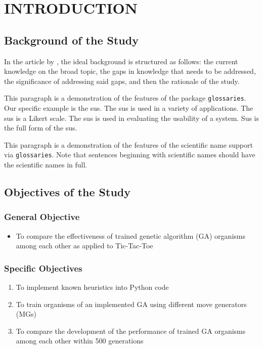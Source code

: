 \documentclass{strrespaper-trad}
\newcommand{\ttt}{Tic-Tac-Toe}
\begin{document}
	\chapter{INTRODUCTION}
		\section{Background of the Study}

			In the article  by \citeauthor{sachdevHowWriteBackground2018}, the ideal background is structured as follows: the current knowledge on the broad topic, the gaps in knowledge that needs to be addressed, the significance of addressing said gaps, and then the rationale of the study.

			This paragraph is a demonstration of the features of the package \texttt{glossaries}.
			Our specific example is the sus.
			The sus is used in a variety of applications.
			The sus is a Likert scale.
			The sus is used in evaluating the usability of a system.
			Sus is the full form of the sus.

			This paragraph is a demonstration of the features of the scientific name support via \texttt{glossaries}.
			Note that sentences beginning with scientific names should have the scientific names in full.

		\section{Objectives of the Study}
			\subsection{General Objective}
				\begin{itemize}
					\item To compare the effectiveness of trained genetic algorithm (GA) organisms among each other as applied to \ttt{}
				\end{itemize}
			\subsection{Specific Objectives}
				\begin{enumerate}
					\item To implement known heuristics into Python code
					\item To train organisms of an implemented GA using different move generators (MGs)
					\item To compare the development of the performance of trained GA organisms among each other within 500 generations
				\end{enumerate}
\end{document}
